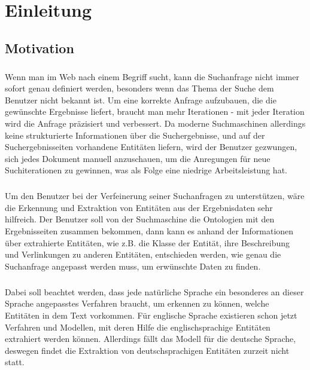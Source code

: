 \chapter{Einleitung}

\section{Motivation}
\label{sec:Motivation}
\paragraph{}
Wenn man im Web nach einem Begriff sucht, kann die Suchanfrage nicht immer sofort genau definiert werden, besonders wenn das Thema der Suche dem Benutzer nicht bekannt ist. Um eine korrekte Anfrage aufzubauen, die die gewünschte Ergebnisse liefert, braucht man mehr Iterationen - mit jeder Iteration wird die Anfrage präzisiert und verbessert. Da moderne Suchmaschinen allerdings keine strukturierte Informationen über die Suchergebnisse, und auf der Suchergebnisseiten vorhandene Entitäten liefern, wird der Benutzer gezwungen, sich jedes Dokument manuell anzuschauen, um die Anregungen für neue Suchiterationen zu gewinnen, was als Folge eine niedrige Arbeitsleistung hat.

\paragraph{}
Um den Benutzer bei der Verfeinerung seiner Suchanfragen zu unterstützen, wäre die Erkennung und Extraktion von Entitäten aus der Ergebnisdaten sehr hilfreich. Der Benutzer soll von der Suchmaschine die Ontologien mit den Ergebnisseiten zusammen bekommen, dann kann es anhand der Informationen über extrahierte Entitäten, wie z.B. die Klasse der Entität, ihre Beschreibung und Verlinkungen zu anderen Entitäten, entschieden werden, wie genau die Suchanfrage angepasst werden muss, um erwünschte Daten zu finden.

\paragraph{}
Dabei soll beachtet werden, dass jede natürliche Sprache ein besonderes an dieser Sprache angepasstes Verfahren braucht, um erkennen zu können, welche Entitäten in dem Text vorkommen. Für englische Sprache existieren schon jetzt Verfahren und Modellen, mit deren Hilfe die englischsprachige Entitäten extrahiert werden können. Allerdings fällt das Modell für die deutsche Sprache, deswegen findet die Extraktion von deutschsprachigen Entitäten zurzeit nicht statt.

